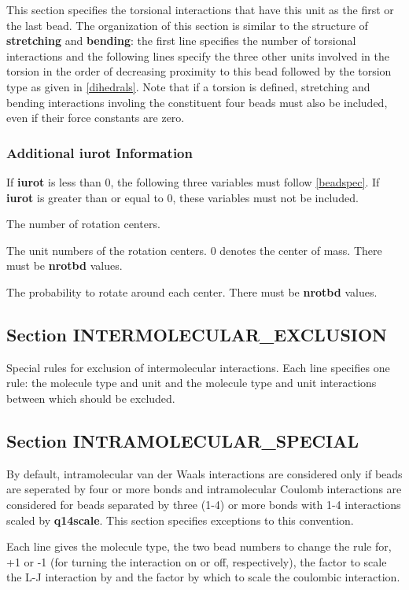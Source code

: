 \documentclass[12pt,letterpaper]{article}
\begin{document}
 This section specifies the torsional
interactions that have this unit as the first or the last
bead. The organization of this section is similar to the
structure of {\bf stretching} and {\bf bending}: the first
line specifies the number of torsional interactions and the
following lines specify the three other units involved in
the torsion in the order of decreasing proximity to this
bead followed by the torsion type as given in
\ref{dihedrals}. Note that if a torsion is defined,
stretching and bending interactions involing the constituent
four beads must also be included, even if their force
constants are zero.

\subsubsection{Additional {\bf iurot} Information}
If {\bf iurot} is less than 0, the following three variables
must follow \ref{beadspec}. If {\bf iurot} is greater than
or equal to 0, these variables must not be included.

 The number of rotation centers.

 The unit numbers of the rotation
centers. 0 denotes the center of mass. There must be {\bf
  nrotbd} values.

 The probability to rotate around
each center. There must be {\bf nrotbd} values.

\subsection{Section \textbf{INTERMOLECULAR\_EXCLUSION}}
Special rules for exclusion of intermolecular interactions.
Each line specifies one rule: the molecule type and unit and
the molecule type and unit interactions between which should
be excluded.

\subsection{Section \textbf{INTRAMOLECULAR\_SPECIAL}}
\label{intra_special}
By default, intramolecular van der Waals interactions are
considered only if beads are seperated by four or more bonds
and intramolecular Coulomb interactions are considered for
beads separated by three (1-4) or more bonds with 1-4
interactions scaled by {\bf q14scale}. This section
specifies exceptions to this convention.

Each line gives the molecule type, the two bead numbers to
change the rule for, +1 or -1 (for turning the interaction
on or off, respectively), the factor to scale the L-J
interaction by and the factor by which to scale the
coulombic interaction.
\end{document}
